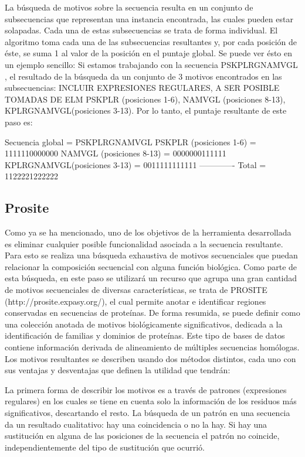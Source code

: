 La búsqueda de motivos sobre la secuencia resulta en un conjunto de subsecuencias que representan una instancia encontrada, las cuales pueden estar solapadas. Cada una de estas subsecuencias se trata de forma individual.
El algoritmo toma cada una de las subsecuencias resultantes y, por cada posición de éste, se suma 1 al valor de la posición en el puntaje global.
Se puede ver ésto en un ejemplo sencillo:
Si estamos trabajando con la secuencia PSKPLRGNAMVGL , el resultado de la búsqueda da un conjunto de 3 motivos encontrados en las subsecuencias: INCLUIR EXPRESIONES REGULARES, A SER POSIBLE TOMADAS DE ELM
PSKPLR (posiciones 1-6), NAMVGL (posiciones 8-13), KPLRGNAMVGL(posiciones 3-13).
Por lo tanto, el puntaje resultante de este paso es:

Secuencia global             =   PSKPLRGNAMVGL
PSKPLR (posiciones 1-6)      =   1111110000000 
NAMVGL (posiciones 8-13)     =   0000000111111  
KPLRGNAMVGL(posiciones 3-13) =   0011111111111
 -------------
Total                        =   1122221222222










\subsection{Prosite}
Como ya se ha mencionado, uno de los objetivos de la herramienta desarrollada es eliminar cualquier posible funcionalidad asociada a la secuencia resultante. Para esto se realiza una búsqueda exhaustiva de motivos secuenciales que puedan relacionar la composición secuencial con alguna función biológica.
Como parte de esta búsqueda, en este paso se utilizará un recurso que agrupa una gran cantidad de motivos secuenciales de diversas características, se trata de PROSITE (http://prosite.expasy.org/), el cual permite anotar e identificar regiones conservadas en secuencias de proteínas.
De forma resumida, se puede definir como una colección anotada de motivos biológicamente significativos, dedicada a la identificación de familias y dominios de proteínas.
Este tipo de bases de datos contiene información derivada de alineamiento de múltiples secuencias homólogas. Los motivos resultantes se describen usando dos métodos distintos, cada uno con sus ventajas y desventajas que definen la utilidad que tendrán:

La primera forma de describir los motivos es a través de patrones (expresiones regulares) en los cuales se tiene en cuenta solo la información de los residuos más significativos, descartando el resto. La búsqueda de un patrón en una secuencia da un resultado cualitativo: hay una coincidencia o no la hay. Si hay una sustitución en alguna de las posiciones de la secuencia el patrón no coincide, independientemente del tipo de sustitución que ocurrió.

